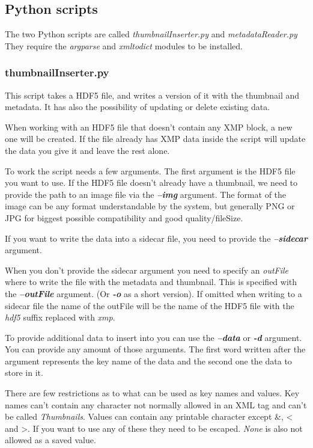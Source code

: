 \subsection{Python scripts}
The two Python scripts are called \emph{thumbnailInserter.py} and \emph{metadataReader.py}
They require the \emph{argparse} and \emph{xmltodict} modules to be installed.

\subsubsection{thumbnailInserter.py}
This script takes a HDF5 file, and writes a version of it with the thumbnail and metadata.
It has also the possibility of updating or delete existing data.

When working with an HDF5 file that doesn't contain any XMP block, a new one will be created.
If the file already has XMP data inside the script will update the data you give it and leave the rest alone.

To work the script needs a few arguments. The first argument is the HDF5 file you want to use.
If the HDF5 file doesn't already have a thumbnail, we need to provide the path to an image file
via the \textbf{\emph{--img}} argument. The format of the image can be any format understandable by the system,
but generally PNG or JPG for biggest possible compatibility and good quality/fileSize.

If you want to write the data into a sidecar file, you need to provide the \textbf{\emph{--sidecar}} argument.

When you don't provide the sidecar argument you need to specify an \emph{outFile}
where to write the file with the metadata and thumbnail.
This is specified with the \textbf{\emph{--outFile}} argument. (Or \textbf{\emph{-o}} as a short version).
If omitted when writing to a sidecar file the name of the outFile will be the name of the
HDF5 file with the \emph{hdf5} suffix replaced with \emph{xmp}.


To provide additional data to insert into you can use the \textbf{\emph{--data}} or \textbf{\emph{-d}} argument.
You can provide any amount of those arguments. The first word written after the argument
represents the key name of the data and the second one the data to store in it.

There are few restrictions as to what can be used as key names and values.
Key names can't contain any character not normally allowed in an XML tag and can't be called \emph{Thumbnails}.
Values can contain any printable character except \&, < and >.
If you want to use any of these they need to be escaped. \emph{None} is also not allowed as a saved value.

